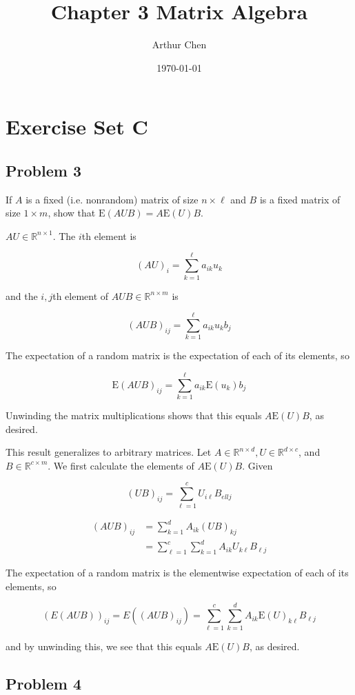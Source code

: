 \documentclass{article}
\author{Arthur Chen}
\title{Chapter 3 Matrix Algebra}
\date{\today}
\newcommand{\R}{\mathbb{R}}
\newcommand{\E}{\text{E}}
\begin{document}
\maketitle

\section*{Exercise Set C}

\subsection*{Problem 3}

If $A$ is a fixed (i.e. nonrandom) matrix of size $n \times \ell$ and $B$ is a fixed matrix of size $1 \times m$, show that $\E(AUB) = A\E(U)B$.

$AU \in \R^{n \times 1}$. The $i$th element is

\[
(AU)_i = \sum_{k=1}^\ell a_{ik}u_k
\]

and the $i,j$th element of $AUB \in \R^{n \times m}$ is

\[
(AUB)_{ij} = \sum_{k=1}^\ell a_{ik}u_k b_j
\]

The expectation of a random matrix is the expectation of each of its elements, so

\[
\E(AUB)_{ij} = \sum_{k=1}^\ell a_{ik} \E(u_k) b_j
\]

Unwinding the matrix multiplications shows that this equals $A\E(U)B$, as desired.

This result generalizes to arbitrary matrices. Let $A \in \R^{n \times d}, U \in \R^{d \times c}$, and $B \in \R^{c \times m}$. We first calculate the elements of $A\E(U)B$. Given

\[
(UB)_{ij} = \sum_{\ell = 1}^c U_{i \ell}B_{ell j}
\]

\begin{align*}
(AUB)_{ij} &= \sum_{k=1}^d A_{ik}(UB)_{kj} \\
&= \sum_{\ell = 1}^c \sum_{k=1}^d A_{ik} U_{k \ell}B_{\ell j}
\end{align*}

The expectation of a random matrix is the elementwise expectation of each of its elements, so

\[
(E(AUB))_{ij} = E((AUB)_{ij}) = \sum_{\ell = 1}^c \sum_{k=1}^d A_{ik} \E(U)_{k \ell}B_{\ell j}
\]

and by unwinding this, we see that this equals $A\E(U)B$, as desired.

\subsection*{Problem 4}
\end{document}
